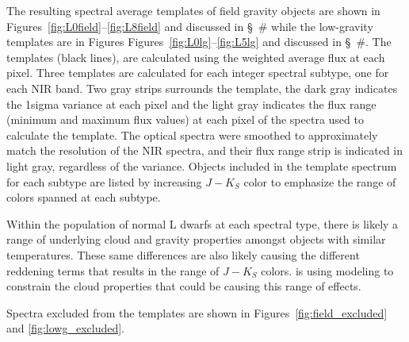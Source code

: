 \documentclass[12pt,preprint]{aastex}
\begin{document}
The resulting spectral average templates of field gravity objects are shown in Figures~\ref{fig:L0field}--\ref{fig:L8field} and discussed in \S~\# while the low-gravity templates are in Figures Figures~\ref{fig:L0lg}--\ref{fig:L5lg} and discussed in \S~\#. The templates (black lines), are calculated using the weighted average flux at each pixel. 
Three templates are calculated for each integer spectral subtype, one for each NIR band. 
Two gray strips surrounds the template, the dark gray indicates the 1sigma variance at each pixel and the light gray indicates the flux range (minimum and maximum flux values) at each pixel of the spectra used to calculate the template. 
The optical spectra were smoothed to approximately match the resolution of the NIR spectra, and their flux range strip is indicated in light gray, regardless of the variance.
Objects included in the template spectrum for each subtype are listed by increasing $J-K_S$ color to emphasize the range of colors spanned at each subtype.

Within the population of normal L dwarfs at each spectral type, there is likely a range of underlying cloud and gravity properties amongst objects with similar temperatures.
These same differences are also likely causing the different reddening terms that results in the range of $J-K_S$ colors. \citet[in prep.]{Hiranaka13} is using modeling to constrain the cloud properties that could be causing this range of effects.

Spectra excluded from the templates are shown in Figures~\ref{fig:field_excluded} and \ref{fig:lowg_excluded}.

\end{document}
